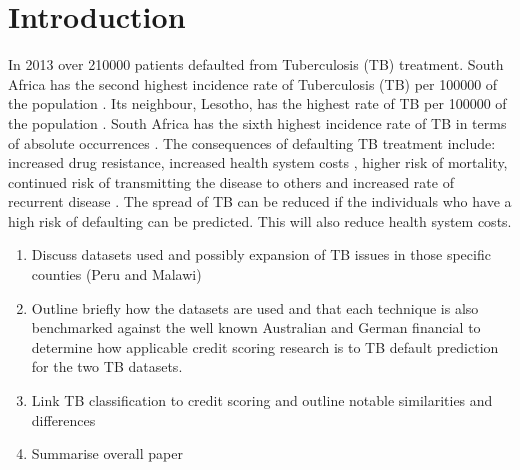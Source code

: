 \documentclass{sig-alternate-05-2015}
\begin{document}
\maketitle
\begin{abstract}
\end{abstract}

%
%
\printccsdesc



\section{Introduction}
In 2013 over 210\hspace*{1mm}000 patients defaulted from Tuberculosis (TB) treatment.
South Africa has the second highest incidence rate of Tuberculosis (TB) per 100\hspace*{1mm}000 of the population \cite{world2015TB}. Its neighbour, Lesotho, has the highest rate of TB per 100\hspace*{1mm}000 of the population \cite{world2015TB}. South Africa has the sixth highest incidence rate of TB in terms of absolute occurrences \cite{world2015TB}. The consequences of defaulting TB treatment include: increased drug resistance, increased health system costs \cite{Lackey:10356751520150601, muture:6660173120110101}, higher risk of mortality, continued risk of transmitting the disease to others \cite{Lackey:10356751520150601} and increased rate of recurrent disease \cite{Jha:10.1371/journal.pone.0008873}. The spread of TB can be reduced if the individuals who have a high risk of defaulting can be predicted. This will also reduce health system costs.

\begin{enumerate}
	\item Discuss datasets used and possibly expansion of TB issues in those specific counties (Peru and Malawi)
	\item Outline briefly how the datasets are used and that each technique is also benchmarked against the well known Australian and German financial to determine how applicable credit scoring research is to TB default prediction for the two TB datasets.
	\item Link TB classification to credit scoring and outline notable similarities and differences
	\item Summarise overall paper
\end{enumerate}
\end{document}
